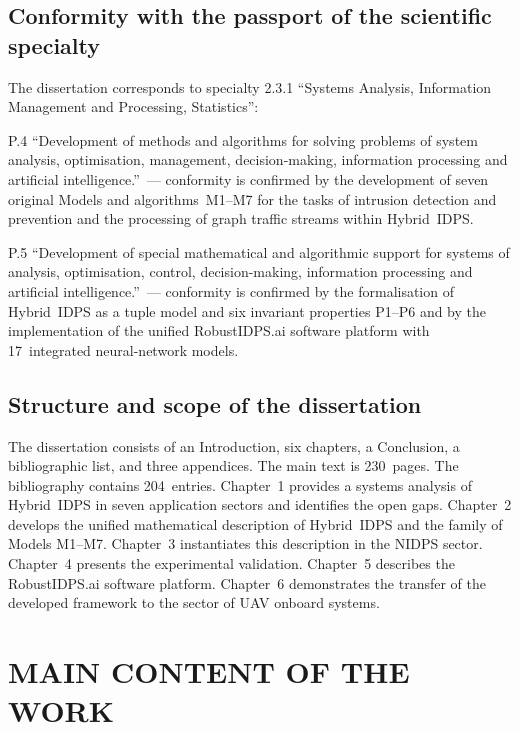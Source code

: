 \documentclass[12pt,a5paper]{article}
\begin{document}
\subsection*{Conformity with the passport of the scientific specialty}

The dissertation corresponds to specialty 2.3.1 ``Systems
Analysis, Information Management and Processing, Statistics'':

\noindent P.4 ``Development of methods and algorithms for
solving problems of system analysis, optimisation, management,
decision-making, information processing and artificial
intelligence.''~--- conformity is confirmed by the development
of seven original Models and algorithms~M1--M7 for the tasks
of intrusion detection and prevention and the processing of
graph traffic streams within Hybrid~IDPS.

\noindent P.5 ``Development of special mathematical and
algorithmic support for systems of analysis, optimisation,
control, decision-making, information processing and
artificial intelligence.''~--- conformity is confirmed by the
formalisation of Hybrid~IDPS as a tuple model and six
invariant properties P1--P6 and by the implementation of the
unified RobustIDPS.ai software platform with 17~integrated
neural-network models.

\subsection*{Structure and scope of the dissertation}

The dissertation consists of an Introduction, six chapters, a
Conclusion, a bibliographic list, and three appendices. The
main text is 230~pages. The bibliography contains 204~entries.
Chapter~1 provides a systems analysis of Hybrid~IDPS in seven
application sectors and identifies the open gaps. Chapter~2
develops the unified mathematical description of Hybrid~IDPS
and the family of Models M1--M7. Chapter~3 instantiates this
description in the NIDPS sector. Chapter~4 presents the
experimental validation. Chapter~5 describes the RobustIDPS.ai
software platform. Chapter~6 demonstrates the transfer of the
developed framework to the sector of UAV onboard systems.

\section*{MAIN CONTENT OF THE WORK}
\end{document}
